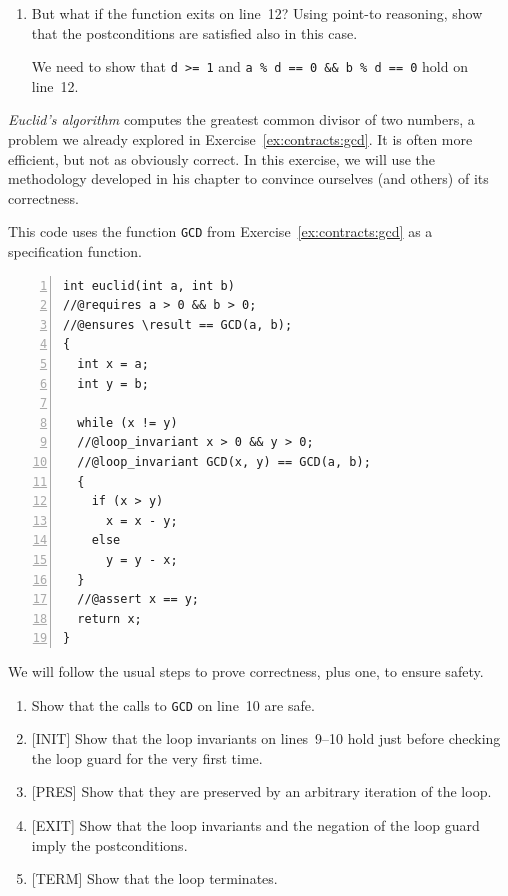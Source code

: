 \begin{flex}
\begin{solution}
\begin{enumerate}[label=\alph*]
\item%
  But what if the function exits on line~12?
  Using point-to reasoning, show that the postconditions are satisfied
  also in this case.

  We need to show that \lstinline'd >= 1' and %
  \lstinline'a % d == 0 && b % d == 0' hold on
  line~12.

  \begin{enumerate}[label=\Alph*.]
  \end{enumerate}
\end{enumerate}
\end{solution}
\end{flex}


\begin{flex}
\begin{exercise}[Euclid]%
\label{ex:contracts:euclid}
  \emph{Euclid's algorithm} computes the greatest common divisor of two
  numbers, a problem we already explored in Exercise~\ref{ex:contracts:gcd}.  It
  is often more efficient, but not as obviously correct.  In this
  exercise, we will use the methodology developed in his chapter to
  convince ourselves (and others) of its correctness.

This code uses the function \lstinline'GCD' from Exercise~\ref{ex:contracts:gcd}
as a specification function.
\begin{lstlisting}[language={[C0]C}, numbers=left]
int euclid(int a, int b)
//@requires a > 0 && b > 0;
//@ensures \result == GCD(a, b);
{
  int x = a;
  int y = b;

  while (x != y)
  //@loop_invariant x > 0 && y > 0;
  //@loop_invariant GCD(x, y) == GCD(a, b);
  {
    if (x > y)
      x = x - y;
    else
      y = y - x;
  }
  //@assert x == y;
  return x;
}
\end{lstlisting}

We will follow the usual steps to prove correctness, plus one, to ensure
safety.
\begin{enumerate}[label=\alph*]
\item%
  Show that the calls to \lstinline'GCD' on line~10
  are safe.
\item {[INIT]} %
  Show that the loop invariants on
  lines~9--10 hold just before
  checking the loop guard for the very first time.
\item {[PRES]} %
  Show that they are preserved by an arbitrary iteration of the loop.
\item {[EXIT]} %
  Show that the loop invariants and the negation of
  the loop guard imply the postconditions.
\item {[TERM]} %
  Show that the loop terminates.
\end{enumerate}
\end{exercise}


\end{flex}
